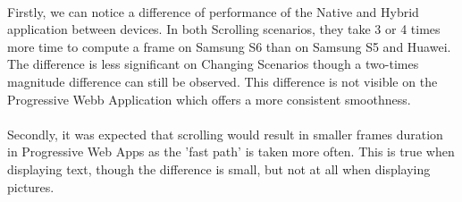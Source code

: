 \documentclass{kththesis}
\begin{document}
\begin{table}[h]
    \centering
    \caption{Average frame rendering duration (ms)}
    \label{tab:smoothness}
\end{table}

\paragraph{}
Firstly, we can notice a difference of performance of the Native and Hybrid application between devices. In both Scrolling scenarios, they take 3 or 4 times more time to compute a frame on Samsung S6 than on Samsung S5 and Huawei. The difference is less significant on Changing Scenarios though a two-times magnitude difference can still be observed. This difference is not visible on the Progressive Webb Application which offers a more consistent smoothness. 

\paragraph{}
Secondly, it was expected that scrolling would result in smaller frames duration in Progressive Web Apps as the 'fast path' is taken more often. This is true when displaying text, though the difference is small, but not at all when displaying pictures. 
\end{document}
